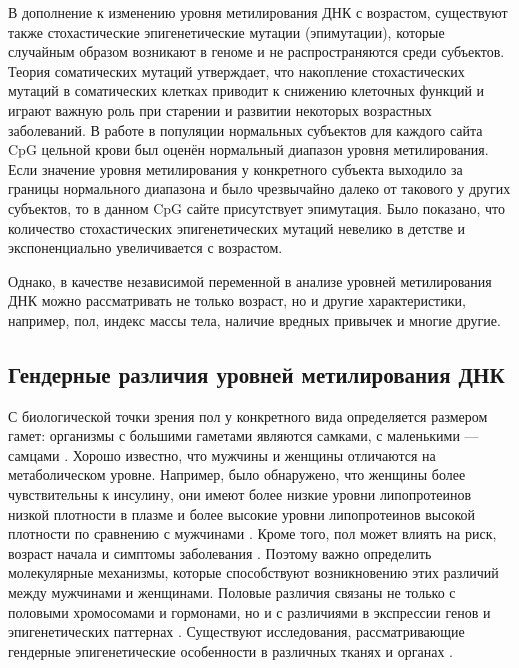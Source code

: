 В дополнение к изменению уровня метилирования ДНК с возрастом, существуют также стохастические эпигенетические мутации (эпимутации), которые случайным образом возникают в геноме и не распространяются среди субъектов. Теория соматических мутаций утверждает, что накопление стохастических мутаций в соматических клетках приводит к снижению клеточных функций \autocite{Kennedy2012} и играют важную роль при старении и развитии некоторых возрастных заболеваний. В работе \autocite{Gentilini2015} в популяции нормальных субъектов для каждого сайта CpG цельной крови был оценён нормальный диапазон уровня метилирования. Если значение уровня метилирования у конкретного субъекта выходило за границы нормального диапазона и было чрезвычайно далеко от такового у других субъектов, то в данном CpG сайте присутствует эпимутация. Было показано, что количество стохастических эпигенетических мутаций невелико в детстве и экспоненциально увеличивается с возрастом. 

Однако, в качестве независимой переменной в анализе уровней метилирования ДНК можно рассматривать не только возраст, но и другие характеристики, например, пол, индекс массы тела, наличие вредных привычек и многие другие.

\subsection{Гендерные различия уровней метилирования ДНК}\label{subsec:ch1/sec1/subsec4}

С биологической точки зрения пол у конкретного вида определяется размером гамет: организмы с большими гаметами являются самками, с маленькими --- самцами \autocite{smith1978evolution}. Хорошо известно, что мужчины и женщины отличаются на метаболическом уровне. Например, было обнаружено, что женщины более чувствительны к инсулину, они имеют более низкие уровни липопротеинов низкой плотности в плазме и более высокие уровни липопротеинов высокой плотности по сравнению с мужчинами \autocite{Freedman2004, Magkos2007}. Кроме того, пол может влиять на риск, возраст начала и симптомы заболевания \autocite{Kim2010}. Поэтому важно определить молекулярные механизмы, которые способствуют возникновению этих различий между мужчинами и женщинами. Половые различия связаны не только с половыми хромосомами и гормонами, но и с различиями в экспрессии генов и эпигенетических паттернах \autocite{Mittelstrass2011, Hall2014}. Существуют исследования, рассматривающие гендерные эпигенетические особенности в различных тканях и органах \autocite{Liu2010, Boks2009}. 

